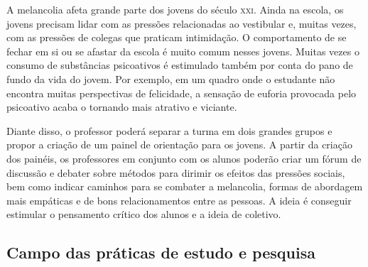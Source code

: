 \documentclass[12pt]{extarticle}
\begin{document}
A melancolia afeta grande parte dos jovens do século \textsc{xxi}. Ainda na
escola, os jovens precisam lidar com as pressões relacionadas ao
vestibular e, muitas vezes, com as pressões de colegas que praticam
intimidação. O comportamento de se fechar em si ou se afastar da
escola é muito comum nesses jovens. Muitas vezes o consumo de
substâncias psicoativos é estimulado também por conta do pano de fundo
da vida do jovem. Por exemplo, em um quadro onde o estudante não
encontra muitas perspectivas de felicidade, a sensação de euforia
provocada pelo psicoativo acaba o tornando mais atrativo e viciante.

Diante disso, o professor poderá separar a turma em dois grandes grupos
e propor a criação de um painel de orientação para os jovens. A partir
da criação dos painéis, os professores em conjunto com os alunos poderão
criar um fórum de discussão e debater sobre métodos para dirimir os
efeitos das pressões sociais, bem como indicar caminhos para se combater
a melancolia, formas de abordagem mais empáticas e de bons
relacionamentos entre as pessoas. A ideia é conseguir estimular o
pensamento crítico dos alunos e a ideia de coletivo.

\subsection{Campo das práticas de estudo e pesquisa}


\end{document}
